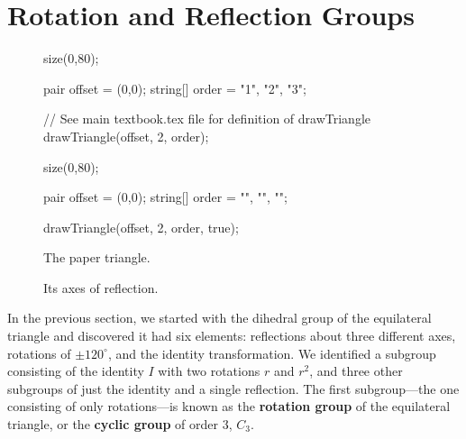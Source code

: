 \documentclass[../textbook.tex]{subfiles}
\begin{document}
\section{Rotation and Reflection Groups}

\begin{figure}[h]
	\begin{center}
		\begin{minipage}[b]{0.45\textwidth}
			\centering
			\begin{asy}[width=0.5\textwidth]
				size(0,80);

				pair offset = (0,0);
				string[] order = {"1", "2", "3"};

				// See main textbook.tex file for definition of drawTriangle
				drawTriangle(offset, 2, order);
			\end{asy}
		\end{minipage}
		\hfill
		\begin{minipage}[b]{0.45\textwidth}
			\centering
			\begin{asy}[width=0.7\textwidth]
				size(0,80);

				pair offset = (0,0);
				string[] order = {"", "", ""};

				drawTriangle(offset, 2, order, true);
			\end{asy}
		\end{minipage}
	\end{center}
	\vspace*{-2\baselineskip}
	\begin{center}
		\begin{minipage}[t]{0.45\textwidth}
			\caption{The paper triangle.}
			\label{fig:paper_triangle}
		\end{minipage}
		\hfill
		\begin{minipage}[t]{0.45\textwidth}
			\caption{Its axes of reflection.}
			\label{fig:triangle_reflections}
		\end{minipage}
	\end{center}
	\vspace*{-2\baselineskip}
\end{figure}

\noindent In the previous section, we started with the dihedral group of the equilateral triangle and discovered it had six elements: reflections about three different axes, rotations of $\pm 120^{\circ}$, and the identity transformation. We identified a subgroup consisting of the identity $I$ with two rotations $r$ and $r^2$, and three other subgroups of just the identity and a single reflection. The first subgroup---the one consisting of only rotations---is known as the \textbf{rotation group} of the equilateral triangle, or the \textbf{cyclic group} of order $3$, $C_3$.
\end{document}
